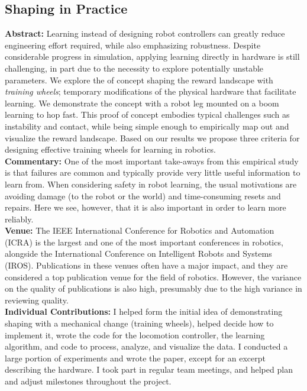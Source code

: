 \subsection{Shaping in Practice}
\textbf{Abstract: }
Learning instead of designing robot controllers can greatly reduce engineering effort required, while also emphasizing robustness. Despite considerable progress in simulation, applying learning directly in hardware is still challenging, in part due to the necessity to explore potentially unstable parameters. We explore the of concept shaping the reward landscape with \emph{training wheels}; temporary modifications of the physical hardware that facilitate learning. We demonstrate the concept with a robot leg mounted on a boom learning to hop fast. This proof of concept embodies typical challenges such as instability and contact, while being simple enough to empirically map out and visualize the reward landscape. Based on our results we propose three criteria for designing effective training wheels for learning in robotics. \\
\textbf{Commentary: }
One of the most important take-aways from this empirical study is that failures are common and typically provide very little useful information to learn from. When considering safety in robot learning, the usual motivations are avoiding damage (to the robot or the world) and time-consuming resets and repairs. Here we see, however, that it is also important in order to learn more reliably. \\
\textbf{Venue: }
The IEEE International Conference for Robotics and Automation (ICRA) is the largest and one of the most important conferences in robotics, alongside the International Conference on Intelligent Robots and Systems (IROS). Publications in these venues often have a major impact, and they are considered a top publication venue for the field of robotics. However, the variance on the quality of publications is also high, presumably due to the high variance in reviewing quality. \\
\textbf{Individual Contributions: }
I helped form the initial idea of demonstrating shaping with a mechanical change (training wheels), helped decide how to implement it, wrote the code for the locomotion controller, the learning algorithm, and code to process, analyze, and visualize the data. I conducted a large portion of experiments and wrote the paper, except for an excerpt describing the hardware. I took part in regular team meetings, and helped plan and adjust milestones throughout the project.
